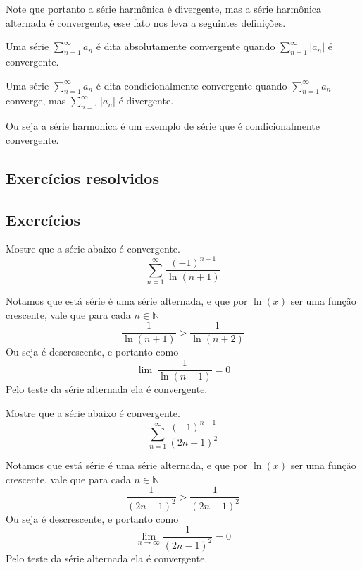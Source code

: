 Note que portanto a série harmônica é divergente, mas a série harmônica alternada
é convergente, esse fato nos leva a seguintes definições.

Uma série $\sum_{n =1}^{\infty} a_n$ é dita absolutamente convergente quando
$\sum_{n =1}^{\infty} |a_n|$ é convergente.

Uma série $\sum_{n =1}^{\infty} a_n$ é dita condicionalmente convergente quando
$\sum_{n =1}^{\infty} a_n$ converge, mas $\sum_{n =1}^{\infty} |a_n|$ é divergente.

Ou seja a série harmonica é um exemplo de série que é condicionalmente convergente.

\subsection*{Exercícios resolvidos}

\construirExeresol


\subsection*{Exercícios}

\construirExer

\begin{exer}
    Mostre que a série abaixo é convergente.
    $$\sum_{n = 1}^{\infty} \frac{(-1)^{n+1}}{\ln(n+1)} $$
\end{exer}

\begin{resp}
    Notamos que está série é uma série alternada, e que por $\ln(x)$ ser uma
    função crescente, vale que para cada $n \in \mathbb{N}$
    $$\frac{1}{\ln(n+1)} > \frac{1}{\ln (n+2)}$$
    Ou seja é descrescente, e portanto como
    $$\lim{\:} \frac{1}{\ln(n+1)} = 0 $$
    Pelo teste da série alternada ela é convergente.
\end{resp}

\begin{exer}
    Mostre que a série abaixo é convergente.
    $$\sum_{n = 1}^{\infty} \frac{(-1)^{n+1}}{(2n-1)^2} $$
\end{exer}

\begin{resp}
    Notamos que está série é uma série alternada, e que por $\ln(x)$ ser uma
    função crescente, vale que para cada $n \in \mathbb{N}$
    $$\frac{1}{(2n-1)^2} > \frac{1}{(2n+1)^2}$$
    Ou seja é descrescente, e portanto como
    $$\lim_{n \to \infty}\frac{1}{(2n-1)^2} = 0 $$
    Pelo teste da série alternada ela é convergente.
\end{resp}

